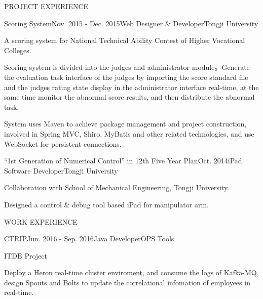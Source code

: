 \documentclass{resume} %
\begin{document}
\begin{rSection}{PROJECT EXPERIENCE}

\begin{rSubsection}{Scoring System}{Nov. 2015 - Dec. 2015}{Web Designer \& Developer}{Tongji University}
\item A scoring system for National Technical Ability Contest of Higher Vocational Colleges.
\item Scoring system is divided into the judges and administrator module。Generate the evaluation task interface of the judges by importing the score standard file and the judges rating state display in the administrator interface real-time, at the same time monitor the abnormal score results, and then distribute the abnormal task.
\item System uses Maven to achieve package management and project construction, involved in Spring MVC, Shiro, MyBatis and other related technologies, and use WebSocket for persistent connections.
\end{rSubsection}


\begin{rSubsection}{“1st Generation of Numerical Control” in 12th Five Year Plan}{Oct. 2014}{iPad Software Developer}{Tongji University}
\item Collaboration with School of Mechanical Engineering, Tongji University.
\item Designed a control \& debug tool based iPad for manipulator arm.
\end{rSubsection}


\end{rSection}

\begin{rSection}{WORK EXPERIENCE}

\begin{rSubsection}{CTRIP}{Jun. 2016 - Sep. 2016}{Java Developer}{OPS Tools}
\item ITDB Project
\item Deploy a Heron real-time cluster enviroment, and consume the logs of  Kafka-MQ, design Spouts and Bolts to update the correlational infomation of employees in real-time.
\end{rSubsection}

\end{rSection}
\end{document}
